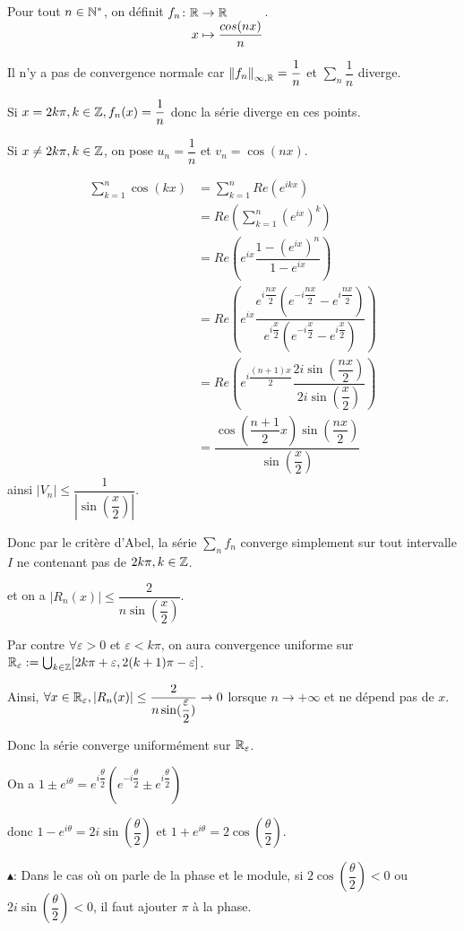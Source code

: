 \documentclass[a4paper, 12pt]{article}
\begin{document}
\begin{exemple}
    Pour tout $n \in \mathbb{N}^*$, on définit $\funcdef{f_n}{\R}{\R}{x}{\dfrac{cos(nx)}{n}}$.

    Il n'y a pas de convergence normale car $\left\lVert f_n\right\rVert_{\infty, \mathbb{R}} = \dfrac{1}{n}$ et $\sum\limits_n \dfrac{1}{n}$ diverge.

    Si $x = 2k\pi, k \in \mathbb{Z}, f_n(x) = \dfrac{1}{n}$ donc la série diverge en ces points.

    Si $x \neq 2k\pi, k \in \mathbb{Z}$, on pose $u_n = \dfrac{1}{n}$ et $v_n = \cos(nx)$.

    \begin{align*}
        \sum_{k=1}^n \cos(kx) &= \sum_{k=1}^n Re(e^{ikx}) \\
        &= Re\left( \sum_{k=1}^n (e^{ix})^k \right) \\
        &= Re\left( e^{ix} \dfrac{1 - (e^{ix})^n}{1 - e^{ix}} \right) \\
        &= Re\left( e^{ix} \dfrac{e^{i\dfrac{nx}{2}}\left( e^{-i\dfrac{nx}{2}} - e^{i\dfrac{nx}{2}} \right)}{e^{i\dfrac{x}{2}} \left( e^{-i\dfrac{x}{2}} - e^{i\dfrac{x}{2}} \right)} \right) \\
        &= Re\left( e^{i\dfrac{(n+1)x}{2}} \dfrac{2i \sin(\dfrac{nx}{2})}{2i \sin(\dfrac{x}{2})} \right) \\
        &= \dfrac{\cos(\dfrac{n+1}{2}x) \sin(\dfrac{nx}{2})}{\sin(\dfrac{x}{2})}
    \end{align*}
    ainsi $ \left| V_n \right| \leq \dfrac{1}{\left| \sin(\dfrac{x}{2}) \right|}$.

    Donc par le critère d'Abel, la série $\sum\limits_n f_n$ converge simplement sur tout intervalle $I$ ne contenant pas de $2k\pi, k \in \mathbb{Z}$.

    et on a $|R_n(x)| \leq \dfrac{2}{n \sin(\dfrac{x}{2})}$.

    Par contre $\forall \varepsilon > 0$ et $\varepsilon < k \pi$, on aura convergence uniforme sur $\mathbb{R}_\varepsilon := \bigcup_{k \in \mathbb{Z}}[2k\pi + \varepsilon, 2(k+1)\pi - \varepsilon]$.

    Ainsi, $\forall x \in \mathbb{R}_\varepsilon, |R_n(x)| \leq \dfrac{2}{n \sin(\dfrac{\varepsilon}{2})} \to 0$ lorsque $n \to +\infty$ et ne dépend pas de $x$.

    Donc la série converge uniformément sur $\mathbb{R}_\varepsilon$.
\end{exemple}

\begin{methode}
    On a $1 \pm e^{i\theta} = e^{i\dfrac{\theta}{2}} \left( e^{-i\dfrac{\theta}{2}} \pm e^{i\dfrac{\theta}{2}} \right)$

    donc $1 - e^{i\theta} = 2i \sin(\dfrac{\theta}{2})$ et $1 + e^{i\theta} = 2\cos(\dfrac{\theta}{2})$.

    $\blacktriangle$: Dans le cas où on parle de la phase et le module, si $2\cos(\dfrac{\theta}{2}) < 0$ ou $2i\sin(\dfrac{\theta}{2}) < 0$, il faut ajouter $\pi$ à la phase.
\end{methode}
\end{document}
